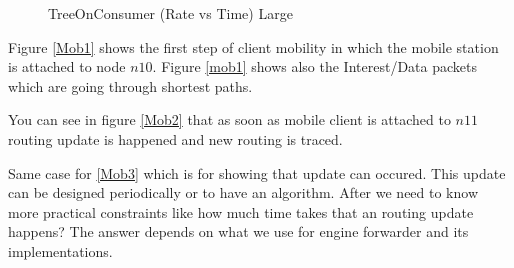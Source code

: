 \begin{figure}[H]
\begin{center}
\caption{TreeOnConsumer (Rate vs Time) Large} \label{treeonconsumer_big} 


\end{center}

\end{figure}


Figure \ref{Mob1} shows the first step of client mobility in which the mobile station is attached to node $n10$. Figure \ref{mob1} shows also the Interest/Data packets which are going through shortest paths.

You can see in figure \ref{Mob2} that as soon as mobile client is attached to $n11$ routing update is happened and new routing is traced.

Same case for \ref{Mob3} which is for showing that update can occured. This update can be designed periodically or to have an algorithm. After we need to know more practical constraints like how much time takes that an routing update happens? The answer depends on what we use for engine forwarder and its implementations. 



